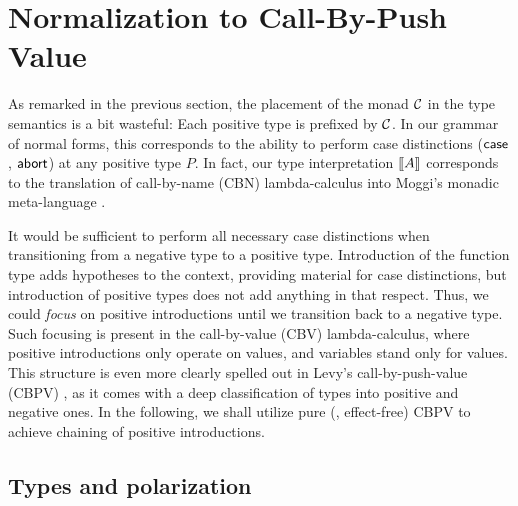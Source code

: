 \documentclass[a4paper,USenglish,cleveref, autoref]{lipics-v2019}
\begin{document}
\section{Normalization to Call-By-Push Value}
\label{sec:cbpv}

As remarked in the previous section, the placement of the monad $\mathcal{C}$
in the type semantics is a bit wasteful:  Each positive type is
prefixed by $\mathcal{C}$.  In our grammar of normal forms, this corresponds to
the ability to perform case distinctions ($\mathsf{case}$, $\mathsf{abort}$) at any
positive type $P$.  In fact, our type interpretation $\mathopen{{[\kern-0.14em[}} A \mathclose{{]\kern-0.14em]}}$
corresponds to the translation of call-by-name (CBN) lambda-calculus
into Moggi's monadic meta-language \cite{moggi:infcomp91,levy:hosc06}.

It would be sufficient %
to perform all necessary
case distinctions
when transitioning from a negative type to a positive type.
Introduction of the function type adds hypotheses to the context,
providing material for case distinctions, but introduction of positive
types does not add anything in that respect.  Thus, we could
\emph{focus} on positive introductions until we transition back to a
negative type.  Such focusing is present in the call-by-value (CBV)
lambda-calculus, where positive introductions only operate on values,
and variables stand only for values.  This structure is even more
clearly spelled out in Levy's call-by-push-value (CBPV)
\cite{levy:hosc06}, as it comes with a deep classification of types
into positive and negative ones.  In the following, we shall utilize
pure (\ie, effect-free) CBPV to achieve chaining of positive
introductions.

\subsection{Types and polarization}
\end{document}

